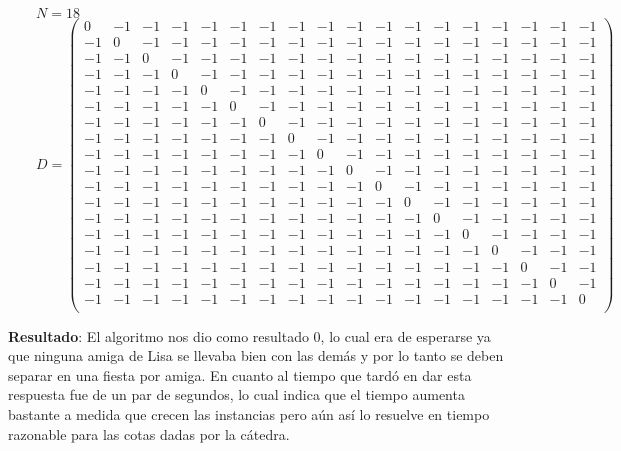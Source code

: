 \begin{flushleft}
$\qquad N = 18$\\[10pt]
$\qquad D = \left( \begin{smallmatrix}
0 & -1 & -1 & -1 & -1 & -1 & -1 & -1 & -1 & -1 & -1 & -1 & -1 & -1 & -1 & -1 & -1 & -1 \\
-1 & 0 & -1 & -1 & -1 & -1 & -1 & -1 & -1 & -1 & -1 & -1 & -1 & -1 & -1 & -1 & -1 & -1 \\
-1 & -1 & 0 & -1 & -1 & -1 & -1 & -1 & -1 & -1 & -1 & -1 & -1 & -1 & -1 & -1 & -1 & -1 \\
-1 & -1 & -1 & 0 & -1 & -1 & -1 & -1 & -1 & -1 & -1 & -1 & -1 & -1 & -1 & -1 & -1 & -1 \\
-1 & -1 & -1 & -1 & 0 & -1 & -1 & -1 & -1 & -1 & -1 & -1 & -1 & -1 & -1 & -1 & -1 & -1 \\
-1 & -1 & -1 & -1 & -1 & 0 & -1 & -1 & -1 & -1 & -1 & -1 & -1 & -1 & -1 & -1 & -1 & -1 \\
-1 & -1 & -1 & -1 & -1 & -1 & 0 & -1 & -1 & -1 & -1 & -1 & -1 & -1 & -1 & -1 & -1 & -1 \\
-1 & -1 & -1 & -1 & -1 & -1 & -1 & 0 & -1 & -1 & -1 & -1 & -1 & -1 & -1 & -1 & -1 & -1 \\
-1 & -1 & -1 & -1 & -1 & -1 & -1 & -1 & 0 & -1 & -1 & -1 & -1 & -1 & -1 & -1 & -1 & -1 \\
-1 & -1 & -1 & -1 & -1 & -1 & -1 & -1 & -1 & 0 & -1 & -1 & -1 & -1 & -1 & -1 & -1 & -1 \\
-1 & -1 & -1 & -1 & -1 & -1 & -1 & -1 & -1 & -1 & 0 & -1 & -1 & -1 & -1 & -1 & -1 & -1 \\
-1 & -1 & -1 & -1 & -1 & -1 & -1 & -1 & -1 & -1 & -1 & 0 & -1 & -1 & -1 & -1 & -1 & -1 \\
-1 & -1 & -1 & -1 & -1 & -1 & -1 & -1 & -1 & -1 & -1 & -1 & 0 & -1 & -1 & -1 & -1 & -1 \\
-1 & -1 & -1 & -1 & -1 & -1 & -1 & -1 & -1 & -1 & -1 & -1 & -1 & 0 & -1 & -1 & -1 & -1 \\
-1 & -1 & -1 & -1 & -1 & -1 & -1 & -1 & -1 & -1 & -1 & -1 & -1 & -1 & 0 & -1 & -1 & -1 \\
-1 & -1 & -1 & -1 & -1 & -1 & -1 & -1 & -1 & -1 & -1 & -1 & -1 & -1 & -1 & 0 & -1 & -1 \\
-1 & -1 & -1 & -1 & -1 & -1 & -1 & -1 & -1 & -1 & -1 & -1 & -1 & -1 & -1 & -1 & 0 & -1 \\
-1 & -1 & -1 & -1 & -1 & -1 & -1 & -1 & -1 & -1 & -1 & -1 & -1 & -1 & -1 & -1 & -1 & 0 \\
\end{smallmatrix} \right)$
\end{flushleft}

\textbf{Resultado}: El algoritmo nos dio como resultado 0, lo cual era de esperarse ya que ninguna amiga de Lisa
se llevaba bien con las demás y por lo tanto se deben separar en una fiesta por amiga. En cuanto al tiempo que 
tardó en dar esta respuesta fue de un par de segundos, lo cual indica que el tiempo aumenta bastante a medida 
que crecen las instancias pero aún así lo resuelve en tiempo razonable para las cotas dadas por la cátedra.
